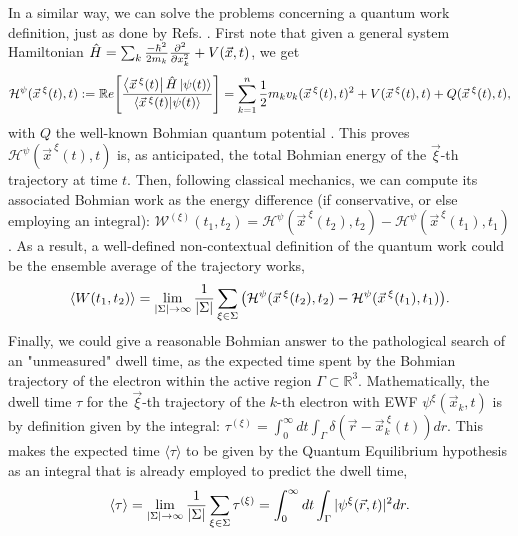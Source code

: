 \documentclass[11pt, a4paper]{article} %
\newcommand{\R}{\mathbb{R}} %
\begin{document}
 In a similar way, we can solve the problems concerning a quantum work definition, just as done by Refs. \cite{work1, work2}. First note that given a general system Hamiltonian $\hat{H}=\sum_k \frac{-\hbar^2}{2m_k}\pdv[2]{}{x_k}+V(\vec{x},t)$, we get
\begin{equation}
\mathcal{H}^\psi(\vec{x}^{\:\xi}(t),t) := \mathbb{R}e\qty[ \frac{\bra{\vec{x}^{\:\xi}(t)}\hat{H}\ket{\psi(t)}}{\bra{\vec{x}^{\:\xi}(t)}\ket{\psi(t)}} ] = \sum_{k=1}^n\frac{1}{2}m_kv_k(\vec{x}^{\:\xi}(t),t)^2+V(\vec{x}^{\:\xi}(t),t)+Q(\vec{x}^{\:\xi}(t),t),
\end{equation}
with $Q$ the well-known Bohmian quantum potential \cite{Holland, Durr, JordiXavier}. This proves $\mathcal{H}^\psi(\vec{x}^{\:\xi}(t),t)$ is, as anticipated, the total Bohmian energy of the $\vec{\xi}$-th trajectory at time $t$. Then, following classical mechanics, we can compute its associated Bohmian work as the energy difference (if conservative, or else employing an integral): $\mathcal{W}^{(\xi)}(t_1,t_2)= \mathcal{H}^\psi(\vec{x}^{\:\xi}(t_2),t_2)-\mathcal{H}^\psi(\vec{x}^{\:\xi}(t_1),t_1)$. As a result, a well-defined non-contextual definition of the quantum work could be the ensemble average of the trajectory works,
\begin{equation}
\langle W(t_1,t_2)\rangle = \lim_{|\Sigma|\rightarrow \infty}\frac{1}{|\Sigma|} \sum_{\xi\in\Sigma} \qty(\mathcal{H}^\psi(\vec{x}^{\:\xi}(t_2),t_2)-\mathcal{H}^\psi(\vec{x}^{\:\xi}(t_1),t_1)).
\end{equation}
Finally, we could give a reasonable Bohmian answer to the pathological search of an "unmeasured" dwell time, as the expected time spent by the Bohmian trajectory of the electron within the active region $\Gamma\subset \R^3$. Mathematically, the dwell time $\tau$ for the $\vec{\xi}$-th trajectory of the $k$-th electron with EWF $\psi^\xi(\vec{x}_k,t)$ is by definition given by the integral: $\tau^{( \xi)}= \int_{0}^\infty  dt \int_\Gamma \delta(\vec{r}-\vec{x}_k^{\:\xi}(t)) dr$. This makes the expected time $\langle \tau\rangle$ to be given by the Quantum Equilibrium hypothesis as an integral that is already employed to predict the dwell time,\vspace{-0.05cm}
\begin{equation}
\langle \tau \rangle = \lim_{|\Sigma|\rightarrow \infty}\frac{1}{|\Sigma|} \sum_{\xi\in\Sigma} \tau^{(\xi)} = \int_{0}^\infty dt \int_\Gamma |\psi^\xi(\vec{r},t)|^2dr.\vspace{-0.14cm}
\end{equation}
\end{document}
